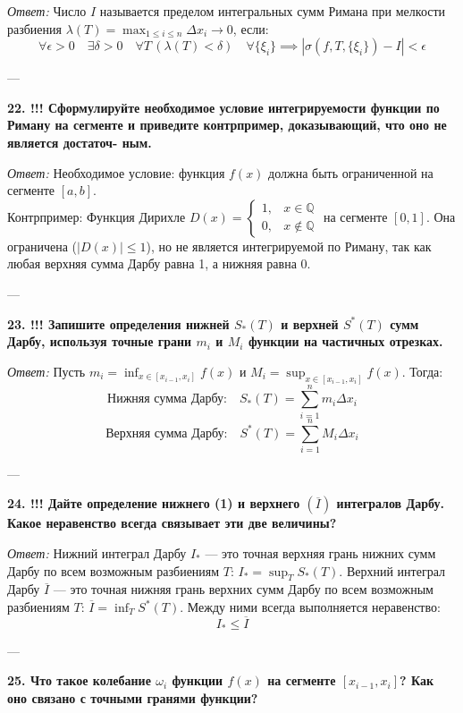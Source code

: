 \documentclass{article}
\begin{document}
\textit{Ответ:} Число $I$ называется пределом интегральных сумм Римана при мелкости разбиения $\lambda(T) = \max_{1 \le i \le n} \Delta x_i \to 0$, если:
$$ \forall \epsilon > 0 \quad \exists \delta > 0 \quad \forall T \, (\lambda(T) < \delta) \quad \forall \{\xi_i\} \implies |\sigma(f, T, \{\xi_i\}) - I| < \epsilon $$

---

\textbf{22. !!! Сформулируйте необходимое условие интегрируемости функции по Риману на сегменте и приведите контрпример, доказывающий, что оно не является достаточ- ным.}

\textit{Ответ:} Необходимое условие: функция $f(x)$ должна быть ограниченной на сегменте $[a, b]$. \\
Контрпример: Функция Дирихле $D(x) = \begin{cases} 1, & x \in \mathbb{Q} \\ 0, & x \notin \mathbb{Q} \end{cases}$ на сегменте $[0, 1]$. Она ограничена ($|D(x)| \le 1$), но не является интегрируемой по Риману, так как любая верхняя сумма Дарбу равна 1, а нижняя равна 0.

---

\textbf{23. !!! Запишите определения нижней $S_{*}(T)$ и верхней $S^{*}(T)$ сумм Дарбу, используя точные грани $m_{i}$ и $M_{i}$ функции на частичных отрезках.}

\textit{Ответ:} Пусть $m_i = \inf_{x \in [x_{i-1}, x_i]} f(x)$ и $M_i = \sup_{x \in [x_{i-1}, x_i]} f(x)$. Тогда:
$$ \text{Нижняя сумма Дарбу:} \quad S_*(T) = \sum_{i=1}^n m_i \Delta x_i $$
$$ \text{Верхняя сумма Дарбу:} \quad S^*(T) = \sum_{i=1}^n M_i \Delta x_i $$

---

\textbf{24. !!! Дайте определение нижнего (1) и верхнего $(\overline{I})$ интегралов Дарбу. Какое неравенство всегда связывает эти две величины?}

\textit{Ответ:} Нижний интеграл Дарбу $I_*$ — это точная верхняя грань нижних сумм Дарбу по всем возможным разбиениям $T$: $I_* = \sup_{T} S_*(T)$. Верхний интеграл Дарбу $\overline{I}$ — это точная нижняя грань верхних сумм Дарбу по всем возможным разбиениям $T$: $\overline{I} = \inf_{T} S^*(T)$. Между ними всегда выполняется неравенство:
$$ I_* \le \overline{I} $$

---

\textbf{25. Что такое колебание $\omega_{i}$ функции $f(x)$ на сегменте $[x_{i-1},x_{i}]$? Как оно связано с точными гранями функции?}
\end{document}
